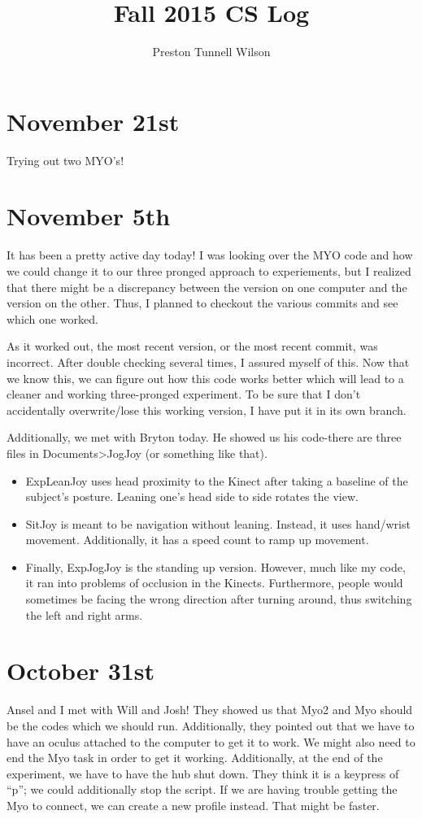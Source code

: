 \documentclass{article}
\begin{document}
\title{
  Fall 2015 CS Log
}

\author{
Preston Tunnell Wilson }

\date{}

\maketitle

\section*{November 21st}
Trying out two MYO's!
\section*{November 5th}
It has been a pretty active day today!
I was looking over the MYO code and how we could change it to our three pronged approach to experiements,
but I realized that there might be a discrepancy between the version on one computer and the version on the other.
Thus, I planned to checkout the various commits and see which one worked.

As it worked out, the most recent version, or the most recent commit, was incorrect.
After double checking several times, I assured myself of this.
Now that we know this, we can figure out how this code works better
which will lead to a cleaner and working three-pronged experiment.
To be sure that I don't accidentally overwrite/lose this working version,
I have put it in its own branch.

Additionally, we met with Bryton today.
He showed us his code-there are three files in Documents>JogJoy (or something like that).
\begin{itemize}
\item ExpLeanJoy uses head proximity to the Kinect after taking a baseline of the subject's posture.
  Leaning one's head side to side rotates the view.
\item SitJoy is meant to be navigation without leaning.
  Instead, it uses hand/wrist movement.
  Additionally, it has a speed count to ramp up movement.
\item Finally, ExpJogJoy is the standing up version.
  However, much like my code, it ran into problems of occlusion in the Kinects.
  Furthermore, people would sometimes be facing the wrong direction after turning around,
  thus switching the left and right arms.
\end{itemize}

\section*{October 31st}
Ansel and I met with Will and Josh!
They showed us that Myo2 and Myo should be the codes which we should run.
Additionally, they pointed out that we have to have an oculus attached to the computer to get it to work.
We might also need to end the Myo task in order to get it working.
Additionally, at the end of the experiment, we have to have the hub shut down.
They think it is a keypress of ``p''; we could additionally stop the script.
If we are having trouble getting the Myo to connect, we can create a new profile instead.
That might be faster.
\end{document}
